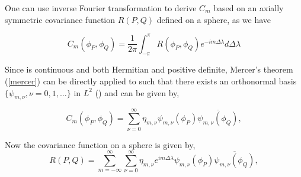 		
		One can use inverse Fourier transformation to derive $C_m$ based on an axially symmetric covariance function $R(P,Q)$ defined on a sphere, as we have
		
	\[ 
	C_m(\phi_P, \phi_Q) = \frac{1}{2\pi}\int_{-\pi}^{\pi} R(\phi_P, \phi_Q)e^{-im\Delta\lambda} d\Delta\lambda \]
	
	Since \Cm is continuous and both Hermitian and positive definite, Mercer's theorem (\ref{mercer}) can be directly applied to \Cm such that there exists an orthonormal basis $\{\psi_{m,\nu}, \nu = 0,1,\ldots \}$ in $L^2$ (\cite{Huang2012}) and \Cm can be given by, 
	
	\[ 
	C_m(\phi_P,\phi_Q) = \sum_{\nu=0}^{\infty} \eta_{m,\nu}\psi_{m,\nu}(\phi_P)\overline{\psi_{m,\nu}(\phi_Q)},  \]
	

Now the covariance function on a sphere is given by,
		\[
			R(P,Q) = \sum_{m=-\infty}^{\infty}\sum_{\nu=0}^{\infty} \eta_{m,\nu}e^{im\Delta\lambda}\psi_{m,\nu}(\phi_P)\overline{\psi_{m,\nu}(\phi_Q)},
		\]
		
